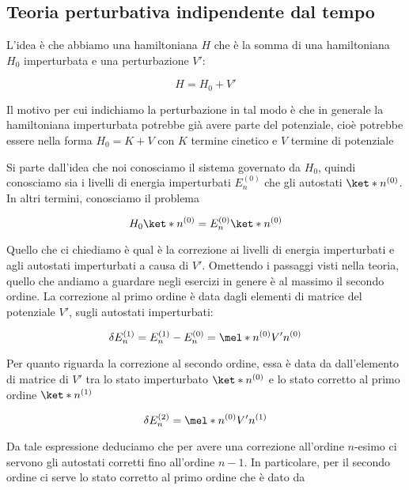 \subsection*{Teoria perturbativa indipendente dal tempo}
L'idea è che abbiamo una hamiltoniana $H$ che è la somma di una hamiltoniana $H_0$ imperturbata e una perturbazione $V'$:

\begin{equation*}
   H=H_0 + V'
\end{equation*}

Il motivo per cui indichiamo la perturbazione in tal modo è che in generale la hamiltoniana imperturbata potrebbe già avere parte del potenziale, cioè potrebbe essere nella forma $H_0=K + V$ con $K$ termine cinetico e $V$ termine di potenziale

Si parte dall'idea che noi conosciamo il sistema governato da $H_0$, quindi conosciamo sia i livelli di energia imperturbati $E_n^{(0)}$ che gli autostati $\ket*{n^{(0)}}$. In altri termini, conosciamo il problema

\begin{equation*}
   H_0\ket*{n^{(0)}}
   =E_n^{(0)}\ket*{n^{(0)}}
\end{equation*}

Quello che ci chiediamo è qual è la correzione ai livelli di energia imperturbati e agli autostati imperturbati a causa di $V'$. Omettendo i passaggi visti nella teoria, quello che andiamo a guardare negli esercizi in genere è al massimo il secondo ordine. La correzione al primo ordine è data dagli elementi di matrice del potenziale $V'$, sugli autostati imperturbati:

\begin{equation*}
   \delta E_n^{(1)}
   =E_n^{(1)} - E_n^{(0)}
   =\mel*{n^{(0)}}{V'}{n^{(0)}}
\end{equation*}

Per quanto riguarda la correzione al secondo ordine, essa è data da dall'elemento di matrice di $V'$ tra lo stato imperturbato $\ket*{n^{(0)}}$ e lo stato corretto al primo ordine $\ket*{n^{(1)}}$

\begin{equation*}
   \delta E_n^{(2)}
   =\mel*{n^{(0)}}{V'}{n^{(1)}}
\end{equation*}

Da tale espressione deduciamo che per avere una correzione all'ordine $n$-esimo ci servono gli autostati corretti fino all'ordine $n-1$. In particolare, per il secondo ordine ci serve lo stato corretto al primo ordine che è dato da

